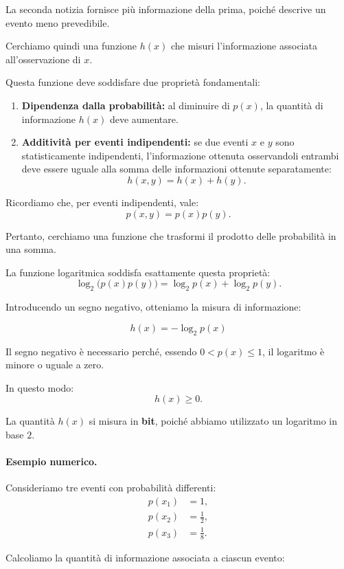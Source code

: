 La seconda notizia fornisce più informazione della prima, poiché descrive un evento meno prevedibile.

Cerchiamo quindi una funzione $h(x)$ che misuri l'informazione associata all'osservazione di $x$.

Questa funzione deve soddisfare due proprietà fondamentali:
\begin{enumerate}
    \item \textbf{Dipendenza dalla probabilità:} al diminuire di $p(x)$, la quantità di informazione $h(x)$ deve aumentare.
    
    \item \textbf{Additività per eventi indipendenti:} se due eventi $x$ e $y$ sono statisticamente indipendenti, l'informazione ottenuta osservandoli entrambi deve essere uguale alla somma delle informazioni ottenute separatamente:
    \[
        h(x,y)=h(x)+h(y).
    \]
\end{enumerate}

Ricordiamo che, per eventi indipendenti, vale:
\[
    p(x,y)=p(x)p(y).
\]

Pertanto, cerchiamo una funzione che trasformi il prodotto delle probabilità in una somma.

La funzione logaritmica soddisfa esattamente questa proprietà:
\[
    \log_2\bigl(p(x)p(y)\bigr)
    =
    \log_2 p(x)+\log_2 p(y).
\]

Introducendo un segno negativo, otteniamo la misura di informazione:

\[
    \boxed{h(x)=-\log_2 p(x)}
\]

Il segno negativo è necessario perché, essendo $0<p(x)\leq 1$, il logaritmo è minore o uguale a zero.

In questo modo:
\[
    h(x)\geq 0.
\]

La quantità $h(x)$ si misura in \textbf{bit}, poiché abbiamo utilizzato un logaritmo in base $2$.

\paragraph{Esempio numerico.}

Consideriamo tre eventi con probabilità differenti:
\[
\begin{aligned}
    p(x_1)&=1,\\
    p(x_2)&=\frac{1}{2},\\
    p(x_3)&=\frac{1}{8}.
\end{aligned}
\]

Calcoliamo la quantità di informazione associata a ciascun evento:

